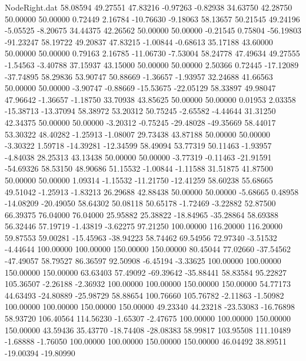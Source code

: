 \begin{filecontents}{NodeRight.dat}
  58.08594   49.27551   47.83216    -0.97263   -0.82938   34.63750   42.28750   50.00000   50.00000    0.72449    2.16784  -10.76630   -9.18063
  58.13657   50.21545   49.24196    -5.05525   -8.20675   34.44375   42.26562   50.00000   50.00000   -0.21545    0.75804  -56.19803  -91.23247
  58.19722   49.20837   47.83215    -1.00844   -0.68613   35.17188   43.60000   50.00000   50.00000    0.79163    2.16785  -11.06730   -7.53004
  58.24778   47.49634   49.27555    -1.54563   -3.40788   37.15937   43.15000   50.00000   50.00000    2.50366    0.72445  -17.12089  -37.74895
  58.29836   53.90747   50.88669    -1.36657   -1.93957   32.24688   41.66563   50.00000   50.00000   -3.90747   -0.88669  -15.53675  -22.05129
  58.33897   49.98047   47.96642    -1.36657   -1.18750   33.70938   43.85625   50.00000   50.00000    0.01953    2.03358  -15.38713  -13.37094
  58.38972   53.20312   50.75245    -2.65582   -4.44644   31.31250   42.34375   50.00000   50.00000   -3.20312   -0.75245  -29.48028  -49.35669
  58.44017   53.30322   48.40282    -1.25913   -1.08007   29.73438   43.87188   50.00000   50.00000   -3.30322    1.59718  -14.39281  -12.34599
  58.49094   53.77319   50.11463    -1.93957   -4.84038   28.25313   43.13438   50.00000   50.00000   -3.77319   -0.11463  -21.91591  -54.69326
  58.53150   48.90686   51.15532    -1.00844   -1.11588   31.51875   41.87500   50.00000   50.00000    1.09314   -1.15532  -11.21750  -12.41259
  58.60238   55.68665   49.51042    -1.25913   -1.83213   26.29688   42.88438   50.00000   50.00000   -5.68665    0.48958  -14.08209  -20.49050
  58.64302   50.08118   50.65178    -1.72469   -3.22882   52.87500   66.39375   76.04000   76.04000   25.95882   25.38822  -18.84965  -35.28864
  58.69388   56.32446   57.19719    -1.43819   -3.62275   97.21250  100.00000  116.20000  116.20000   59.87553   59.00281  -15.45963  -38.94223
  58.74462   69.54956   72.97340    -3.51532   -4.44644  100.00000  100.00000  150.00000  150.00000   80.45044   77.02660  -37.54562  -47.49057
  58.79527   86.36597   92.50908    -6.45194   -3.33625  100.00000  100.00000  150.00000  150.00000   63.63403   57.49092  -69.39642  -35.88441
  58.83584   95.22827  105.36507    -2.26188   -2.36932  100.00000  100.00000  150.00000  150.00000   54.77173   44.63493  -24.80889  -25.98729
  58.88654  100.76660  105.76782    -2.11863   -1.50982  100.00000  100.00000  150.00000  150.00000   49.23340   44.23218  -23.53083  -16.76898
  58.93720  106.40564  114.56230    -1.65307   -2.47675  100.00000  100.00000  150.00000  150.00000   43.59436   35.43770  -18.74408  -28.08383
  58.99817  103.95508  111.10489    -1.68888   -1.76050  100.00000  100.00000  150.00000  150.00000   46.04492   38.89511  -19.00394  -19.80990

\end{filecontents}
